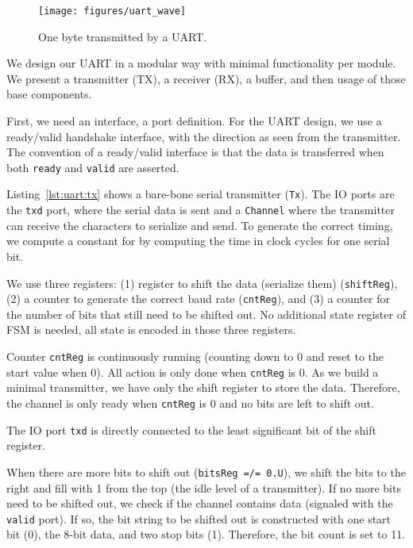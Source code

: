 \documentclass[%
    10pt,
    headinclude, footexclude,
    openright, %
    notitlepage,
    cleardoubleempty,
    headsepline,
    pointlessnumbers,
    bibtotoc, idxtotoc,
    ]{scrbook}
\newcommand{\code}[1]{{\small{\texttt{#1}}}}
\begin{document}
\begin{figure}
  \centering
  \texttt{[image: figures/uart\_wave]}
  \caption{One byte transmitted by a UART.}
  \label{fig:uart:wave}
\end{figure}

We design our UART in a modular way with minimal functionality
per module. We present a transmitter (TX), a receiver (RX),
a buffer, and then usage of those base components.

First, we need an interface, a port definition.
For the UART design, we use a ready/valid handshake interface,
with the direction as seen from the transmitter.
The convention of a ready/valid interface is that the data is transferred
when both \code{ready} and \code{valid} are asserted.


Listing~\ref{lst:uart:tx} shows a bare-bone serial transmitter (\code{Tx}).
The IO ports are the \code{txd} port, where the serial data is sent and
a \code{Channel} where the transmitter can receive the characters to serialize
and send.
To generate the correct timing, we compute a constant for by computing
the time in clock cycles for one serial bit.

We use three registers:
(1) register to shift the data (serialize them) (\code{shiftReg}),
(2) a counter to generate the correct baud rate (\code{cntReg}), and
(3) a counter for the number of bits that still need to be shifted out.
No additional state register of FSM is needed, all state is encoded in
those three registers.

Counter \code{cntReg} is continuously running (counting down to 0
and reset to the start value when 0). All action is only done when
\code{cntReg} is 0. As we build a minimal transmitter, we have only
the shift register to store the data. Therefore, the channel is only ready
when \code{cntReg} is 0 and no bits are left to shift out.

The IO port \code{txd} is directly connected to the least significant bit
of the shift register.

When there are more bits to shift out (\code{bitsReg =/= 0.U}),
we shift the bits to the right and fill with 1 from the top (the idle level
of a transmitter).
If no more bits need to be shifted out, we check if the channel contains
data (signaled with the \code{valid} port). If so, the bit string to
be shifted out is constructed with one start bit (0), the 8-bit data, and
two stop bits (1). Therefore, the bit count is set to 11.
\end{document}
